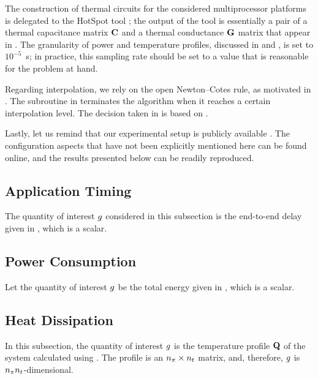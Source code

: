 The construction of thermal  circuits for the considered multiprocessor
platforms is delegated to the HotSpot tool \cite{skadron2004}; the output of the
tool is essentially a pair of a thermal capacitance matrix $\mathbf{C}$ and a thermal
conductance $\mathbf{G}$ matrix that appear in . The granularity
of power and temperature profiles, discussed in  and
, is set to $10^{-5}$~s; in practice, this sampling rate
should be set to a value that is reasonable for the problem at hand.

Regarding interpolation, we rely on the open Newton--Cotes rule, as motivated in
. The  subroutine in 
terminates the algorithm when it reaches a certain interpolation level. The
decision taken in  is based on .

Lastly, let us remind that our experimental setup is publicly available
\cite{sources}. The configuration aspects that have not been explicitly
mentioned here can be found online, and the results presented below can be
readily reproduced.

\subsection{Application Timing}

The quantity of interest $g$ considered in this subsection is the end-to-end
delay given in , which is a scalar.

\subsection{Power Consumption}

Let the quantity of interest $g$ be the total energy given in
, which is a scalar.

\subsection{Heat Dissipation}

In this subsection, the quantity of interest $g$ is the temperature profile
$\mathbf{Q}$ of the system calculated using . The profile is an
${n_\pi} \times {n_t}$ matrix, and, therefore, $g$ is ${n_\pi} {n_t}$-dimensional.

